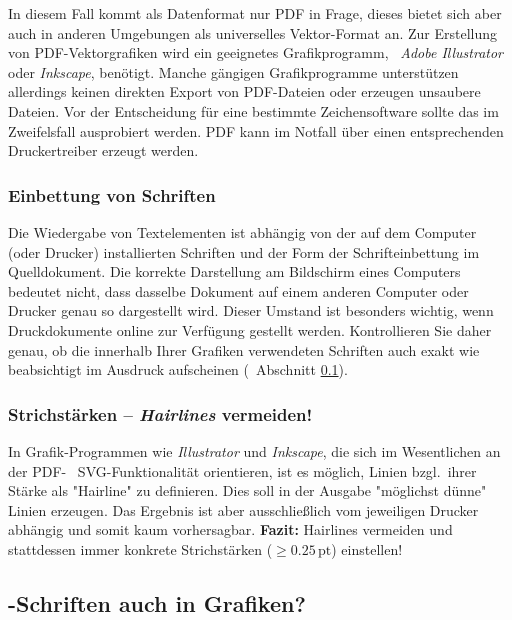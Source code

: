 In diesem Fall kommt als Datenformat nur PDF in Frage, dieses bietet sich
aber auch in anderen Umgebungen als universelles Vektor-Format an. Zur
Erstellung von PDF-Vektorgrafiken wird ein geeignetes Grafikprogramm, \zB\
\emph{Adobe Illustrator} oder \emph{Inkscape}, benötigt. Manche gängigen
Grafikprogramme unterstützen allerdings keinen direkten Export von PDF-Dateien
oder erzeugen unsaubere Dateien. Vor der Entscheidung für eine bestimmte
Zeichensoftware sollte das im Zweifelsfall ausprobiert werden. PDF kann im
Notfall über einen entsprechenden Druckertreiber erzeugt werden.


\subsubsection{Einbettung von Schriften}

Die Wiedergabe von Textelementen ist abhängig von der auf dem Computer (oder
Drucker) installierten Schriften und der Form der Schrifteinbettung im
Quelldokument. Die korrekte Darstellung am Bildschirm eines Computers
bedeutet nicht, dass dasselbe Dokument auf einem anderen Computer oder
Drucker genau so dargestellt wird. Dieser Umstand ist besonders wichtig, wenn
Druckdokumente online zur Verfügung gestellt werden. Kontrollieren Sie daher
genau, ob die innerhalb Ihrer Grafiken verwendeten Schriften auch exakt wie
beabsichtigt im Ausdruck aufscheinen 
(\sa\ Abschnitt \ref{sec:tex-schriften-in-grafiken}).


\subsubsection{Strichstärken -- \emph{Hairlines} vermeiden!}

In Grafik-Programmen wie \emph{Illustrator} und \emph{Inkscape}, die sich im
Wesentlichen an der PDF- \bzw\ SVG-Funktionalität orientieren, 
ist es möglich, Linien bzgl.\ ihrer Stärke als "Hairline" zu definieren. Dies 
soll in der Ausgabe "möglichst dünne" Linien erzeugen. Das Ergebnis ist 
aber ausschließlich vom jeweiligen Drucker abhängig und somit kaum 
vorhersagbar. \textbf{Fazit:} Hairlines vermeiden und stattdessen immer 
konkrete Strichstärken ($\geq 0.25\,\mathrm{pt}$) einstellen!


\subsection{\tex-Schriften auch in Grafiken?}
\label{sec:tex-schriften-in-grafiken}

